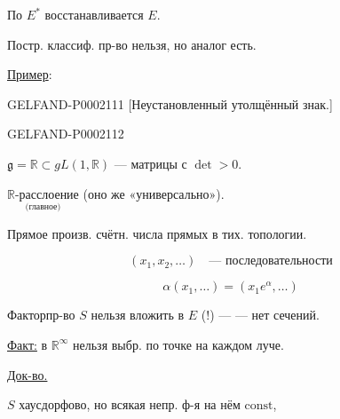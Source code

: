 По $E^*$ восстанавливается $E$.



Постр. классиф. пр-во нельзя, но аналог есть.



\underline{Пример}:



\begin{GelfandAdjacentEvidence}{GELFAND-P000211}{1}
[Неустановленный утолщённый знак.]
\end{GelfandAdjacentEvidence}
\begin{GelfandAdjacentEvidence}{GELFAND-P000211}{2}

$\mathfrak g=\mathbb R\subset gL(1,\mathbb R)$ --- матрицы с $\det>0$.
\end{GelfandAdjacentEvidence}

 $\underset{\text{(главное)}}{\mathbb R\text{-расслоение}}$ (оно же «универсально»).



Прямое произв. счётн. числа прямых в тих. топологии.



\begin{equation*}(x_1,x_2,\ldots)\quad\text{--- последовательности}\end{equation*}



\begin{equation*}\alpha(x_1,\ldots)=(x_1e^\alpha,\ldots)\end{equation*}



Факторпр-во $S$ нельзя вложить в $E$ (!) ---
--- нет сечений.



\underline{Факт:} в $\mathbb R^\infty$ нельзя выбр. по точке на каждом луче.



\underline{Док-во.}



$S$ хаусдорфово, но всякая непр. ф-я на нём $\mathrm{const}$,




